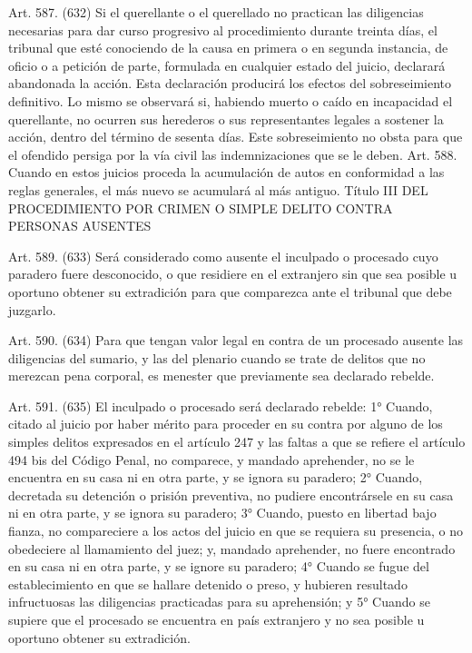     Art. 587. (632) Si el querellante o el querellado no practican las diligencias necesarias para dar curso progresivo al procedimiento durante treinta días, el tribunal que esté conociendo de la causa en primera o en segunda instancia, de oficio o a petición de parte, formulada en cualquier estado del juicio, declarará abandonada la acción.
    Esta declaración producirá los efectos del sobreseimiento definitivo.
    Lo mismo se observará si, habiendo muerto o caído en incapacidad el querellante, no ocurren sus herederos o sus representantes legales a sostener la acción, dentro del término de sesenta días.
    Este sobreseimiento no obsta para que el ofendido persiga por la vía civil las indemnizaciones que se le deben.
    Art. 588. Cuando en estos juicios proceda la acumulación de autos en conformidad a las reglas generales, el más nuevo se acumulará al más antiguo.
  Título III
  DEL PROCEDIMIENTO POR CRIMEN O SIMPLE DELITO CONTRA
PERSONAS AUSENTES

    Art. 589. (633) Será considerado como ausente el inculpado o procesado cuyo paradero fuere desconocido, o que residiere en el extranjero sin que sea posible u oportuno obtener su extradición para que comparezca ante el tribunal que debe juzgarlo.



    Art. 590. (634) Para que tengan valor legal en contra de un procesado ausente las diligencias del sumario, y las del plenario cuando se trate de delitos que no merezcan pena corporal, es menester que previamente sea declarado rebelde.



    Art. 591. (635) El inculpado o procesado será declarado rebelde:
    1° Cuando, citado al juicio por haber mérito para proceder en su contra por alguno de los simples delitos expresados en el artículo 247 y las faltas a que se refiere el artículo 494 bis del Código Penal, no comparece, y mandado aprehender, no se le encuentra en su casa ni en otra parte, y se ignora su paradero;
    2° Cuando, decretada su detención o prisión preventiva, no pudiere encontrársele en su casa ni en otra parte, y se ignora su paradero;
    3° Cuando, puesto en libertad bajo fianza, no compareciere a los actos del juicio en que se requiera su presencia, o no obedeciere al llamamiento del juez;
y, mandado aprehender, no fuere encontrado en su casa ni en otra parte, y se ignore su paradero;
    4° Cuando se fugue del establecimiento en que se hallare detenido o preso, y hubieren resultado infructuosas las diligencias practicadas para su aprehensión; y
    5° Cuando se supiere que el procesado se encuentra en país extranjero y no sea posible u oportuno obtener su extradición.


